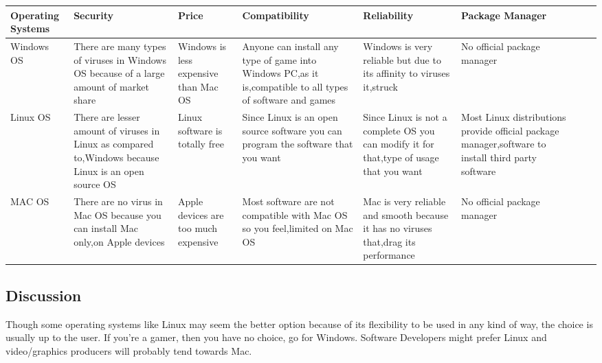 \begin{tabular}{|l|l|l|l|l|l|l|l|}
\hline
Operating Systems & Security                                                                                              & Price                                 & Compatibility                                                                                              & Reliability                                                                             & Package Manager                                                                                   \\ \hline
\parbox{2cm}{Windows OS}        & \parbox{3cm}{There are many types of viruses in Windows OS because of a large amount of market share}               & \parbox{2cm}{Windows is less expensive than Mac OS} & \parbox{3cm}{ Anyone can install any type of game into Windows PC,as it is,compatible to all types of software and games} & \parbox{2cm}{Windows is very reliable but due to its affinity to viruses it,struck }                  & \parbox{2cm}{No official package manager}                                                                         \\ \hline
\parbox{2cm}{Linux OS}         & \parbox{3cm}{There are lesser amount of viruses in Linux as compared to,Windows because Linux is an open source OS} & \parbox{2cm}{ Linux software is totally free}        & \parbox{3cm}{ Since Linux is an open source software you can program the software that you want}  & \parbox{2cm}{Since Linux is not a complete OS you can modify it for that,type of usage that you want} & \parbox{2cm}{Most Linux distributions provide official package manager,software to install third party software} \\ \hline
\parbox{2cm}{MAC OS}           & \parbox{3cm}{There are no virus in Mac OS because you can install Mac only,on Apple devices}      & \parbox{2cm}{Apple devices are too much expensive}  & \parbox{3cm}{Most software are not compatible with Mac OS so you feel,limited on Mac OS }                              & \parbox{2cm}{Mac is very reliable and smooth because it has no viruses that,drag its performance}     & \parbox{2cm}{No official package manager}                                                                       \\ \hline
\end{tabular}



\subsection{Discussion}
Though some operating systems like Linux may seem the better option because of its flexibility to be
used in any kind of way, the choice is usually up to the user. If you’re a gamer, then you have no choice,
go for Windows. Software Developers might prefer Linux and video/graphics producers will probably
tend towards Mac.


